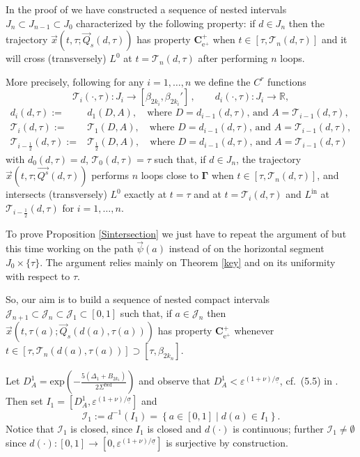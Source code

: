 \documentclass[10pt]{article}
\numberwithin{equation}{section}
\def\sTfwd{\Sigma^{\textrm{fwd}}}
\def\ep{\varepsilon}
\def\R{{\mathbb R}}
\def\ee{{\mathrm e}}
\def\TTT{\mathscr{T}}
\def\Q{\vec{Q}}
\def\x{\vec{x}}
\newcommand\bs[1]{{\boldsymbol{#1}}}
\def\inn{\textrm{in}}
\theoremstyle{definition}
\theoremstyle{remark}
\begin{document}
 In the proof of \cite[Theorem 3.4]{CFPrestate} we have constructed a sequence of nested intervals $J_n \subset J_{n-1} \subset J_0$
 characterized by the following property:  if
$d \in J_n$ then the trajectory $\x(t,\tau ; \Q_s(d,\tau))$ has property $\bs{C^+_{\ee^+}}$ when $t \in [\tau, \TTT_n(d,\tau)]$  and it will cross
(transversely)
$L^0$ at $t= \TTT_n(d,\tau)$ after performing $n$ loops.


More precisely, following \cite{CFPrestate}
for any  $i=1,\dots,n$ we   define the $C^r$ functions
$$
  \TTT_i(\cdot ,\tau): J_i \to  [\beta_{2k_i}, \beta_{2k_{i}}'] \, , \qquad   d_i(\cdot ,\tau): J_i \to  \R,
$$
\begin{equation}\label{Tn}
\begin{split}
d_{i}(d,\tau):= & d_{1}(D,A), \quad \textrm{where $D=d_{i-1}(d,\tau)$, and $A=\TTT_{i-1}(d,\tau)$},\\
\TTT_{i}(d,\tau):= & \TTT_{1}(D,A), \quad \textrm{where $D=d_{i-1}(d,\tau)$, and $A=\TTT_{i-1}(d,\tau)$},\\
\TTT_{i-\frac{1}{2}}(d,\tau):= & \TTT_{\frac{1}{2}}(D,A), \quad \textrm{where $D=d_{i-1}(d,\tau)$, and $A=\TTT_{i-1}(d,\tau)$}
\end{split}
\end{equation}
with $d_0(d,\tau)=d$, $\TTT_0(d,\tau)=\tau$
such that, if
$d \in J_n$, the trajectory $\x (t,\tau; \vec{Q^s}(d,\tau))$ performs $n$ loops close to $\bs{\Gamma}$ when $t \in [\tau,  \TTT_n(d,\tau)]$,
and intersects (transversely) $L^0$ exactly at $t=\tau$ and at $t= \TTT_i(d ,\tau)$ and $L^{\inn}$ at $\TTT_{i-\frac{1}{2}}(d,\tau)$ for $i=1, \ldots, n$.

To prove Proposition \ref{Sintersection} we just have to repeat the argument of \cite[Theorem~3.4]{CFPrestate} but this time working on the path $\vec{\psi}(a)$
instead of on the horizontal segment $J_0\times \{\tau \}$.
The argument relies mainly on Theorem \ref{key} and on its uniformity with respect to $\tau$.


So, our aim is to build a sequence of nested compact intervals $\mathcal{J}_{n+1} \subset \mathcal{J}_{n} \subset
\mathcal{J}_1 \subset [0,1]$
such that, if $a \in \mathcal{J}_{n}$ then  $\x(t,\tau(a); \Q_s(d(a),\tau(a)))$ has property $\bs{C^+_{\ee^+}}$
 whenever $t \in [\tau, \TTT_n(d(a),\tau(a))] \supset [\tau, \beta_{2k_n}]$.

Let  $D_A^1=\textrm{exp}\left(-\frac{5(\Delta_1 +B_{2k_1})}{2 \sTfwd}\right)$ and observe that $D_A^1 < \ep^{(1+\nu)/\underline{\sigma}}$, cf.~(5.5) %
 in
\cite{CFPrestate}. Then set
$I_1 = \left[ D_A^1   ,  \ep^{(1+\nu)/\underline{\sigma}}\right]$ and
$$
\mathcal{I}_1:= d^{-1}(I_1)= \left\{ a \in [0,1] \mid d(a) \in I_1  \right\}.$$
Notice that $\mathcal{I}_1$ is closed,  since $I_1$ is closed and $d(\cdot)$ is continuous; further $\mathcal{I}_1 \ne \emptyset$
since $d(\cdot):[0,1] \to  [0,\ep^{(1+\nu)/\underline{\sigma}}]$ is surjective by construction.
\end{document}

